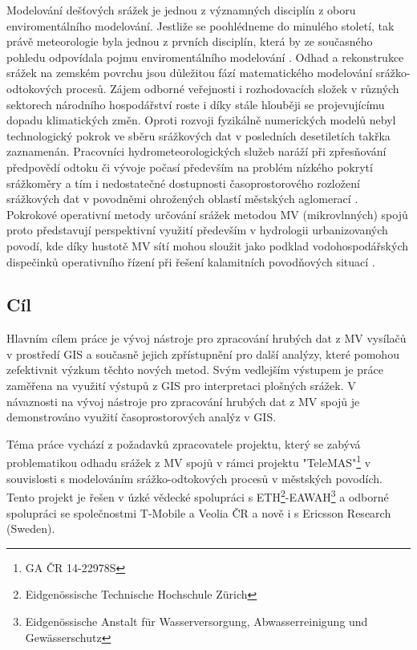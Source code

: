 \documentclass[a4paper,12pt,oneside]{report}
\begin{document}
Modelování dešťových srážek je jednou z významných disciplín z oboru
enviromentálního modelování. Jestliže se poohlédneme do 
minulého století, tak právě meteorologie byla jednou z prvních
disciplín, která by ze současného pohledu odpovídala pojmu enviromentálního
modelování \cite{wpc, neuman}. Odhad a rekonstrukce srážek na 
zemském povrchu jsou důležitou fází matematického modelování srážko-odtokových
procesů. Zájem odborné veřejnosti i rozhodovacích složek v různých
sektorech národního hospodářství roste i díky stále hlouběji se
projevujícímu dopadu klimatických změn. Oproti rozvoji fyzikálně
numerických modelů nebyl technologický pokrok ve sběru srážkových dat
v posledních desetiletích takřka zaznamenán. Pracovníci
hydrometeorologických služeb naráží při zpřesňování předpovědí odtoku
či vývoje počasí především na problém nízkého pokrytí srážkoměry a tím
i nedostatečné dostupnosti časoprostorového rozložení srážkových dat v
povodněmi ohrožených oblastí městských aglomerací \cite{slavicek}. Pokrokové
operativní metody určování srážek metodou MV (mikrovlnných) spojů proto představují
perspektivní využití především v hydrologii urbanizovaných povodí, kde
díky hustotě MV sítí mohou sloužit jako podklad vodohospodářských
dispečinků operativního řízení při řešení kalamitních povodňových
situací \cite{countryw}.



\subsection*{Cíl}
Hlavním cílem práce je vývoj nástroje pro zpracování hrubých dat
z MV vysílačů v prostředí GIS a současně jejich zpřístupnění pro další analýzy, které
pomohou zefektivnit výzkum těchto nových metod. Svým vedlejším
výstupem je práce zaměřena na využití výstupů z GIS
pro interpretaci plošných srážek. V návaznosti na vývoj nástroje pro
zpracování hrubých dat z MV spojů je demonstrováno využití
časoprostorových analýz v GIS.

Téma práce vychází z požadavků zpracovatele projektu, který se zabývá
problematikou odhadu srážek z MV spojů v rámci projektu
"TeleMAS"\footnote{GA ČR 14-22978S } v souvislosti s
modelováním srážko-odtokových procesů v městských povodích. Tento
projekt je řešen v úzké vědecké spolupráci s ETH\footnote{
  Eidgenössische Technische Hochschule
  Zürich}-EAWAH\footnote{Eidgenössische Anstalt für Wasserversorgung,
  Abwasserreinigung und Gewässerschutz} a odborné spolupráci se
společnostmi T-Mobile a Veolia ČR a nově i s Ericsson Research
(Sweden).
\end{document}
